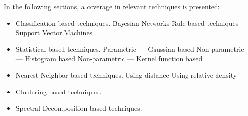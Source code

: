 In the following sections, a coverage in relevant techniques is presented:

\begin{itemize}
	\setlength\itemsep{-0.5em}
	\item Classification based techniques.
	\subitem Bayesian Networks
	\subitem Rule-based techniques
	\subitem Support Vector Machines
	
	\item Statistical based techniques.
	\subitem Parametric --- Gaussian based
	\subitem Non-parametric --- Histogram based
	\subitem Non-parametric --- Kernel function based
	
	\item Nearest Neighbor-based techniques.
	\subitem Using distance
	\subitem Using relative density
	
	\item Clustering based techniques.
	
	\item Spectral Decomposition based techniques.
	
\end{itemize}

